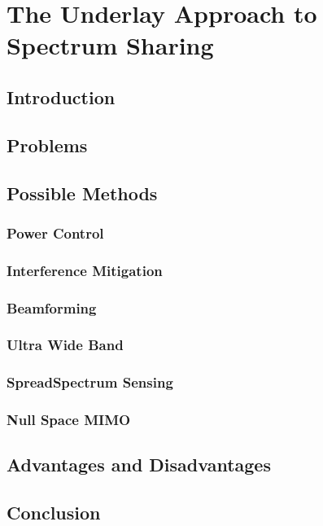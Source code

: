 \chapter{The Underlay Approach to Spectrum Sharing}
\section{Introduction}
\section{Problems}
\section{Possible Methods}
\subsection{Power Control}
\subsection{Interference Mitigation}
\subsection{Beamforming}
\subsection{Ultra Wide Band}
\subsection{SpreadSpectrum Sensing}
\subsection{Null Space MIMO}
\section{Advantages and Disadvantages}
\section{Conclusion}